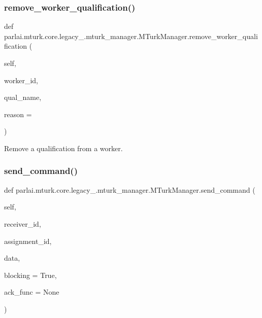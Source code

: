 \subsubsection{\texorpdfstring{remove\+\_\+worker\+\_\+qualification()}{remove\_worker\_qualification()}}
{\footnotesize\ttfamily def parlai.\+mturk.\+core.\+legacy\+\_.\+mturk\+\_\+manager.\+M\+Turk\+Manager.\+remove\+\_\+worker\+\_\+qualification (\begin{DoxyParamCaption}\item[{}]{self,  }\item[{}]{worker\+\_\+id,  }\item[{}]{qual\+\_\+name,  }\item[{}]{reason = {\ttfamily \textquotesingle{}\textquotesingle{}} }\end{DoxyParamCaption})}

\begin{DoxyVerb}Remove a qualification from a worker.
\end{DoxyVerb}
 \mbox{\label{classparlai_1_1mturk_1_1core_1_1legacy__2018_1_1mturk__manager_1_1MTurkManager_a6b43f0d326a90ffa3aab0a94699b95e0}} 
\subsubsection{\texorpdfstring{send\+\_\+command()}{send\_command()}}
{\footnotesize\ttfamily def parlai.\+mturk.\+core.\+legacy\+\_.\+mturk\+\_\+manager.\+M\+Turk\+Manager.\+send\+\_\+command (\begin{DoxyParamCaption}\item[{}]{self,  }\item[{}]{receiver\+\_\+id,  }\item[{}]{assignment\+\_\+id,  }\item[{}]{data,  }\item[{}]{blocking = {\ttfamily True},  }\item[{}]{ack\+\_\+func = {\ttfamily None} }\end{DoxyParamCaption})}

